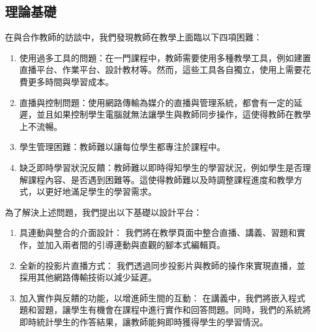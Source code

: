 \documentclass[12pt]{article}
\begin{document}
\subsection{理論基礎}
在與合作教師的訪談中，我們發現教師在教學上面臨以下四項困難：
\begin{enumerate}[label=(\arabic*)]
  \item 使用過多工具的問題：在一門課程中，教師需要使用多種教學工具，例如建置直播平台、作業平台、設計教材等。然而，這些工具各自獨立，使用上需要花費更多時間與學習成本。
  \item 直播與控制問題：使用網路傳輸為媒介的直播與管理系統，都會有一定的延遲，並且如果控制學生電腦就無法讓學生與教師同步操作，這使得教師在教學上不流暢。
  \item 學生管理困難：教師難以讓每位學生都專注於課程中。
  \item 缺乏即時學習狀況反饋：教師難以即時得知學生的學習狀況，例如學生是否理解課程內容、是否遇到困難等。這使得教師難以及時調整課程進度和教學方式，以更好地滿足學生的學習需求。
\end{enumerate}
\par 為了解決上述問題，我們提出以下基礎以設計平台：
\begin{enumerate}[label=(\arabic*)]
  \item 具連動與整合的介面設計：
  我們將在教學頁面中整合直播、講義、習題和實作，並加入兩者間的引導連動與直觀的腳本式編輯頁。
  \item 全新的投影片直播方式：
  我們透過同步投影片與教師的操作來實現直播，並採用其他網路傳輸技術以減少延遲。
  \item 加入實作與反饋的功能，以增進師生間的互動：
  在講義中，我們將嵌入程式題和習題，讓學生有機會在課程中進行實作和回答問題。同時，我們的系統將即時統計學生的作答結果，讓教師能夠即時獲得學生的學習情況。
\end{enumerate}
\end{document}
